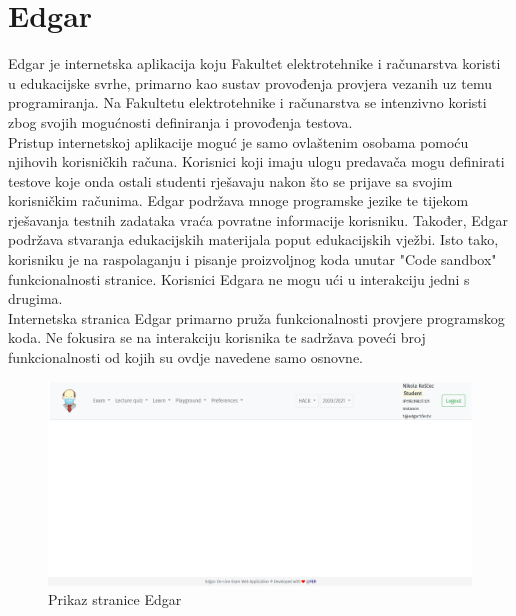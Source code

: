 \documentclass[times, utf8, zavrsni]{fer}
\begin{document}
		\section{Edgar}
		Edgar je internetska aplikacija koju Fakultet elektrotehnike i računarstva koristi u edukacijske svrhe, primarno kao sustav provođenja provjera vezanih uz temu programiranja. Na Fakultetu elektrotehnike i računarstva se intenzivno koristi zbog svojih mogućnosti definiranja i provođenja testova. \\
		Pristup internetskoj aplikacije moguć je samo ovlaštenim osobama pomoću njihovih korisničkih računa. Korisnici koji imaju ulogu predavača mogu definirati testove koje onda ostali studenti rješavaju nakon što se prijave sa svojim korisničkim računima. Edgar podržava mnoge programske jezike te tijekom rješavanja testnih zadataka vraća povratne informacije korisniku. Također, Edgar podržava stvaranja edukacijskih materijala poput edukacijskih vježbi. Isto tako, korisniku je na raspolaganju i pisanje proizvoljnog koda unutar "Code sandbox" funkcionalnosti stranice. Korisnici Edgara ne mogu ući u interakciju jedni s drugima.\\
		Internetska stranica Edgar primarno pruža funkcionalnosti provjere programskog koda. Ne fokusira se na interakciju korisnika te sadržava poveći broj funkcionalnosti od kojih su ovdje navedene samo osnovne.
		\begin{figure}[H]
			\centering
			\includegraphics[width=\linewidth]{pictures/prikazi/Edgar.png}
			\caption{Prikaz stranice Edgar}
			\label{fig:edgar}
		\end{figure}
	
\end{document}
